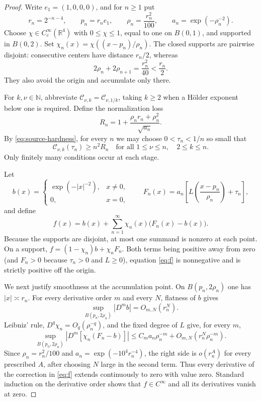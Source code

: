\documentclass[11pt]{article}
\newcommand{\R}{\mathbb R}
\newcommand{\N}{\mathbb N}
\begin{document}
\begin{proof}
Write \(e_1=(1,0,0,0)\), and for \(n\geq1\) put
\begin{equation}\label{eq:scales}
 r_n=2^{-n-4},\qquad p_n=r_ne_1,\qquad
 \rho_n=\frac{r_n^2}{100},\qquad
 a_n=\exp(-\rho_n^{-2}).
\end{equation}
Choose \(\chi\in C_c^\infty(\R^4)\) with \(0\leq\chi\leq1\), equal to one
on \(B(0,1)\), and supported in \(B(0,2)\).  Set
\(\chi_n(x)=\chi((x-p_n)/\rho_n)\).  The closed supports are pairwise
disjoint: consecutive centers have distance \(r_n/2\), whereas
\[
 2\rho_n+2\rho_{n+1}
 =\frac{r_n^2}{40}<\frac{r_n}{2}.
\]
They also avoid the origin and accumulate only there.

For \(k,\nu\in\N\), abbreviate
\(\mathcal C_{\nu,k}=\mathcal C_{\nu,1/k}\), taking \(k\geq2\) when a
H\"older exponent below one is required.  Define the normalization loss
\begin{equation}\label{eq:Rn}
 R_n=1+\frac{\rho_nr_n+\rho_n^2}{\sqrt{a_n}}.
\end{equation}
By \eqref{eq:source-hardness}, for every \(n\) we may choose
\(0<\tau_n<1/n\) so small that
\begin{equation}\label{eq:diagonal}
 \mathcal C_{\nu,k}(\tau_n)\geq n^2R_n
 \quad\text{for all }1\leq\nu\leq n,\quad 2\leq k\leq n.
\end{equation}
Only finitely many conditions occur at each stage.

Let
\[
 b(x)=\begin{cases}\exp(-|x|^{-2}),&x\neq0,\\0,&x=0,\end{cases}
 \qquad
 F_n(x)=a_n\left[L\left(\frac{x-p_n}{\rho_n}\right)+\tau_n\right],
\]
and define
\begin{equation}\label{eq:f}
 f(x)=b(x)+\sum_{n=1}^\infty
 \chi_n(x)\bigl(F_n(x)-b(x)\bigr).
\end{equation}
Because the supports are disjoint, at most one summand is nonzero at each
point.  On a support, \(f=(1-\chi_n)b+\chi_nF_n\).  Both terms being positive
away from zero (and \(F_n>0\) because \(\tau_n>0\) and \(L\geq0\)), equation
\eqref{eq:f} is nonnegative and is strictly positive off the origin.

We next justify smoothness at the accumulation point.  On
\(B(p_n,2\rho_n)\) one has \(|x|\asymp r_n\).  For every derivative order
\(m\) and every \(N\), flatness of \(b\) gives
\[
 \sup_{B(p_n,2\rho_n)}|D^mb|=O_{m,N}(r_n^N).
\]
Leibniz' rule, \(D^q\chi_n=O_q(\rho_n^{-q})\), and the fixed degree of \(L\)
give, for every \(m\),
\begin{equation}\label{eq:flat-estimate}
 \sup_{B(p_n,2\rho_n)}
 \left|D^m\!\left[\chi_n(F_n-b)\right]\right|
 \leq C_m a_n\rho_n^{-m}+O_{m,N}(r_n^N\rho_n^{-m}).
\end{equation}
Since \(\rho_n=r_n^2/100\) and
\(a_n=\exp(-10^4r_n^{-4})\), the right side is \(o(r_n^A)\) for every
prescribed \(A\), after choosing \(N\) large in the second term.  Thus every
derivative of the correction in \eqref{eq:f} extends continuously to zero
with value zero.  Standard induction on the derivative order shows that
\(f\in C^\infty\) and all its derivatives vanish at zero.


\end{proof}
\end{document}
